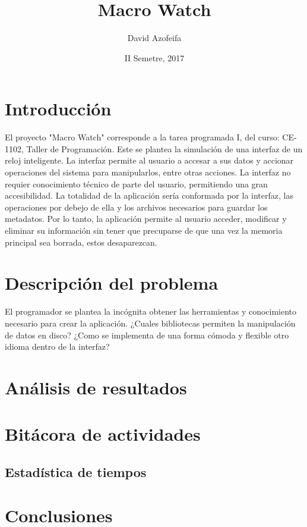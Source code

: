 \documentclass{article}[12pt]
\title{Macro Watch}
\author{David Azofeifa}
\date{II Semetre, 2017}
\begin{document}
    \maketitle
    \tableofcontents
    \section{Introducción}
    \p
    El proyecto "Macro Watch" corresponde a la tarea programada I, del curso: CE-1102, Taller de Programación. Este se plantea la simulación de una interfaz de un reloj inteligente. La interfaz permite al usuario a accesar a sus datos y accionar operaciones del sistema para manipularlos, entre otras acciones. La interfaz no requier conocimiento técnico de parte del usuario, permitiendo una gran accesibilidad. La totalidad de la aplicación sería conformada por la interfaz, las operaciones por debejo de ella y los archivos necesarios para guardar los metadatos. Por lo tanto, la aplicación permite al usuario acceder, modificar y eliminar su información sin tener que precuparse de que una vez la memoria principal sea borrada, estos desaparezcan.

    \section{Descripción del problema}
    El programador se plantea la incógnita obtener las herramientas y conocimiento necesario para crear la aplicación. ¿Cuales bibliotecas permiten la manipulación de datos en disco? ¿Como se implementa de una forma cómoda y flexible otro idioma dentro de la interfaz?
    
    \section{Análisis de resultados}

    \section{Bitácora de actividades}

    \subsection{Estadística de tiempos}

    \section{Conclusiones}
\end{document}
